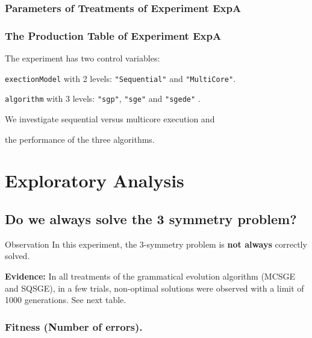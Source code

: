 \documentclass[18pt,c]{beamer}
\makeatletter
\let\beamer@writeslidentry@miniframeson=\beamer@writeslidentry
\newcommand*{\miniframeson}{\let\beamer@writeslidentry=\beamer@writeslidentry@miniframeson}
\makeatother
\begin{document}
 \begin{frame}
 \fontsize{8pt}{9pt}\selectfont
 \frametitle{ Parameters of Treatments of Experiment ExpA }

 \label{ExpADifferentTable000.tex}  
 \end{frame}

 \begin{frame}
 \fontsize{8pt}{9pt}\selectfont
 \frametitle{ The Production Table of Experiment ExpA }

 \label{ExpAGrammarTable000.tex}  
 \end{frame}

\begin{frame}
\vspace*{2mm}
\begin{block}{

}
The experiment has two control variables:
 
{\tt exectionModel} with 2 levels: {\tt "Sequential"} and {\tt "MultiCore"}.
 
{\tt algorithm} with 3 levels: {\tt "sgp"}, {\tt "sge"} and {\tt "sgede"} .
 
We investigate sequential versus multicore execution and
 
the performance of the three algorithms.
\end{block}
\end{frame}%
\miniframeson
\section{Exploratory Analysis}
\miniframeson
\subsection{Do we {\bf always} solve the 3 symmetry problem?}
\begin{frame}
\vspace*{2mm}
\begin{block}{
Observation
}
In this experiment, the 3-symmetry problem is {\bf not always} correctly solved.
 
{\bf Evidence:}
In all treatments of the grammatical evolution algorithm (MCSGE and SQSGE), 
in a few trials, non-optimal solutions were observed with a limit of 1000 generations.
See next table.
\end{block}
\end{frame}%
 \begin{frame}
 \fontsize{8pt}{9pt}\selectfont
 \frametitle{ Fitness (Number of errors). }

 \label{ExpAStatsTable000.tex}  
 \end{frame}
\end{document}
